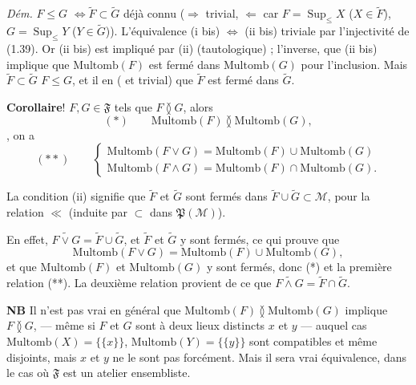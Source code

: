 \documentclass[11pt,a4paper]{article}
\begin{document}
\emph{Dém.} $F \leq G$  $\Leftrightarrow \widetilde{F} \subset \widetilde{G}$  déjà connu \struck{\ill{}} \add{\ill{}} ($\Rightarrow$ trivial, $\Leftarrow$ car $F = \operatorname{Sup}_{\leq} X$ ($X \in \widetilde{F}$), $G = \operatorname{Sup}_{\leq} Y$ ($Y \in \widetilde{G}$)). L'équivalence (i bis) $\Leftrightarrow$ (ii bis) triviale par l'injectivité de (1.39). Or (ii bis) est impliqué par (ii) (tautologique) ; \ill{} l'inverse, \ill{} que (ii bis) implique que $\mathrm{Multomb}(F)$ est fermé dans $\mathrm{Multomb}(G)$ pour l'inclusion. Mais $\widetilde{F} \subset \widetilde{G}$ \struck{\ill{}}  $F \leq G$, et il en \ill{} (\ill{} et trivial) que $\widetilde{F}$ est fermé dans $\widetilde{G}$.

\textbf{Corollaire}!   $F, G \in \mathfrak{F}$ tels que $F \between G$, alors 
\[
  (*) \qquad \mathrm{Multomb}(F) \between \mathrm{Multomb}(G),
\]
, on a
\[
  (**) \qquad \begin{cases} \mathrm{Multomb}(F \vee G) = \mathrm{Multomb}(F) \cup \mathrm{Multomb}(G) \\ \mathrm{Multomb}(F \wedge G) = \mathrm{Multomb}(F) \cap \mathrm{Multomb}(G). \end{cases}
\]

La condition (ii) signifie que $\widetilde{F}$ et $\widetilde{G}$ sont fermés dans $\widetilde{F} \cup \widetilde{G} \subset \mathcal{M}$, pour la relation $\ll$ (induite par $\subset$ dans $\mathfrak{P}(\mathcal{M})$).

En effet, $\widetilde{F \vee G} = \widetilde{F} \cup \widetilde{G}$, et $\widetilde{F}$ et $\widetilde{G}$ y sont fermés,  ce qui prouve que
\[
  \mathrm{Multomb}(F \vee G) = \mathrm{Multomb}(F) \cup \mathrm{Multomb}(G),
\]
et que $\mathrm{Multomb}(F)$ et $\mathrm{Multomb}(G)$ y sont fermés, donc (*) et la première relation (**). La deuxième relation provient de ce que $\widetilde{F \wedge G} = \widetilde{F} \cap \widetilde{G}$.

\textbf{NB} Il n'est pas vrai en général que $\mathrm{Multomb}(F) \between \mathrm{Multomb}(G)$ implique $F \between G$, --- même si $F$ et $G$ sont  à deux lieux distincts $x$ et $y$ --- auquel cas $\mathrm{Multomb}(X) = \lbrace \lbrace x \rbrace \rbrace$, $\mathrm{Multomb}(Y) = \lbrace \lbrace y \rbrace \rbrace$ sont compatibles et même disjoints, mais $x$ et $y$ ne le sont pas forcément. Mais il sera vrai \ill{} équivalence, dans le cas où $\mathfrak{F}$ est un atelier ensembliste.
\end{document}
